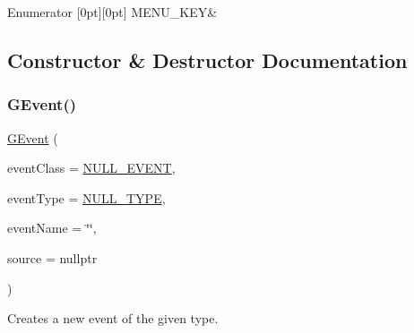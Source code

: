 \begin{DoxyEnumFields}{Enumerator}
[0pt][0pt]{}\mbox{\label{classsgl_1_1GEvent_a7885f47644a0388f981f416fa20389b2adf85174536cbc6cb5b6f4a9ae61aaf4c}} 
M\+E\+N\+U\+\_\+\+K\+EY&\\
\hline

\end{DoxyEnumFields}


\subsection{Constructor \& Destructor Documentation}
\mbox{\label{classsgl_1_1GEvent_a310475311d619e2b4066a0ee34c1153e}} 
\subsubsection{\texorpdfstring{G\+Event()}{GEvent()}}
{\footnotesize\ttfamily \mbox{\hyperlink{classsgl_1_1GEvent}{G\+Event}} (\begin{DoxyParamCaption}\item[{\mbox{\hyperlink{namespacesgl_a6ff6e8ee75a08092e30167b2b7c5d6f7}{Event\+Class}}}]{event\+Class = {\ttfamily \mbox{\hyperlink{namespacesgl_a6ff6e8ee75a08092e30167b2b7c5d6f7ad986036666e3b6f3a053e2b1f43c1495}{N\+U\+L\+L\+\_\+\+E\+V\+E\+NT}}},  }\item[{\mbox{\hyperlink{namespacesgl_a2628ea8d12e8b2563c32f05dc7fff6fa}{Event\+Type}}}]{event\+Type = {\ttfamily \mbox{\hyperlink{namespacesgl_a2628ea8d12e8b2563c32f05dc7fff6faa74cf8825b522b9721ea02973803d76b4}{N\+U\+L\+L\+\_\+\+T\+Y\+PE}}},  }\item[{const std\+::string \&}]{event\+Name = {\ttfamily \char`\"{}\char`\"{}},  }\item[{\mbox{\hyperlink{classsgl_1_1GObservable}{G\+Observable}} $\ast$}]{source = {\ttfamily nullptr} }\end{DoxyParamCaption})}



Creates a new event of the given type. 

\mbox{\label{classsgl_1_1GEvent_a294ad1d22669baa2bae04f3d75eb183c}} 
